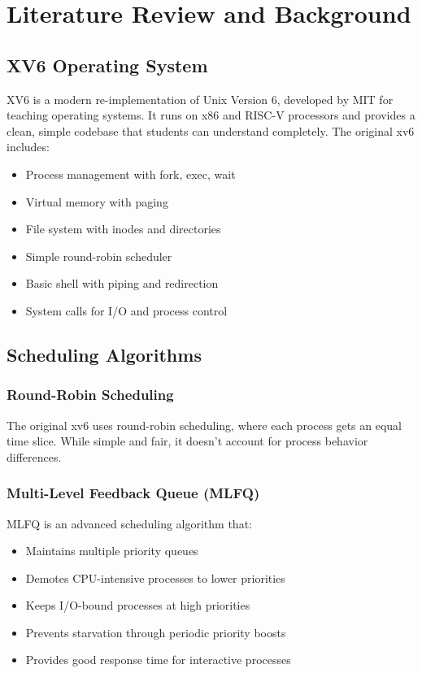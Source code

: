 \documentclass[a4paper,12pt]{report}
\begin{document}
\newpage

\chapter{Literature Review and Background}
\thispagestyle{contentpages}
\justifying

\section{XV6 Operating System}

XV6 is a modern re-implementation of Unix Version 6, developed by MIT for teaching operating systems. It runs on x86 and RISC-V processors and provides a clean, simple codebase that students can understand completely. The original xv6 includes:

\begin{itemize}
    \item Process management with fork, exec, wait
    \item Virtual memory with paging
    \item File system with inodes and directories
    \item Simple round-robin scheduler
    \item Basic shell with piping and redirection
    \item System calls for I/O and process control
\end{itemize}

\section{Scheduling Algorithms}

\subsection{Round-Robin Scheduling}
The original xv6 uses round-robin scheduling, where each process gets an equal time slice. While simple and fair, it doesn't account for process behavior differences.

\subsection{Multi-Level Feedback Queue (MLFQ)}
MLFQ is an advanced scheduling algorithm that:
\begin{itemize}
    \item Maintains multiple priority queues
    \item Demotes CPU-intensive processes to lower priorities
    \item Keeps I/O-bound processes at high priorities
    \item Prevents starvation through periodic priority boosts
    \item Provides good response time for interactive processes
\end{itemize}
\end{document}

